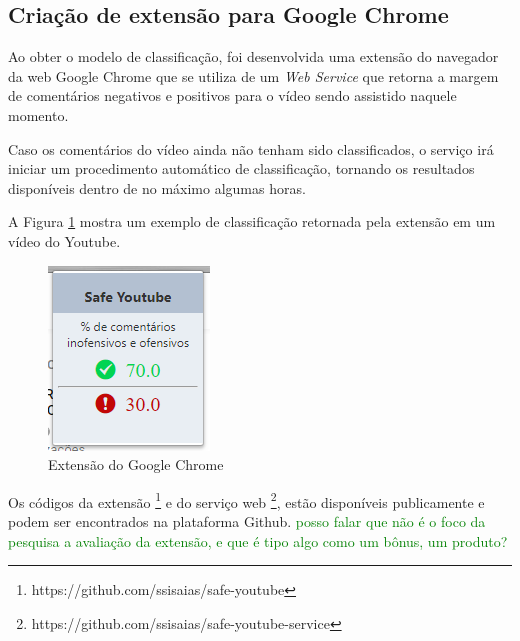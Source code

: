 \subsection{Criação de extensão para Google Chrome}

Ao obter o modelo de classificação, foi desenvolvida uma extensão do navegador da web Google Chrome que se utiliza de um \textit{Web Service} que retorna a margem de comentários negativos e positivos para o vídeo sendo assistido naquele momento. 

Caso os comentários do vídeo ainda não tenham sido classificados, o serviço irá iniciar um procedimento automático de classificação, tornando os resultados disponíveis dentro de no máximo algumas horas.

A Figura \ref{fig:chrome_plugin} mostra um exemplo de classificação retornada pela extensão em um vídeo do Youtube.

\begin{figure}[H] %
	\caption{\label{fig:chrome_plugin} Extensão do Google Chrome}
	\begin{center}
	    \includegraphics[scale=1.2]{figuras/extensao_chrome.PNG} %
	\end{center}
\end{figure}

Os códigos da extensão \footnote{https://github.com/ssisaias/safe-youtube} e do serviço web \footnote{https://github.com/ssisaias/safe-youtube-service}, estão disponíveis publicamente e podem ser encontrados na plataforma Github.
\textcolor{green}{posso falar que não é o foco da pesquisa a avaliação da extensão, e que é tipo algo como um bônus, um produto?}

